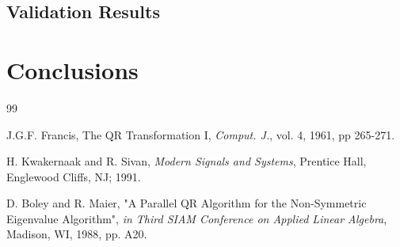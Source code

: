 \documentclass[letterpaper, 10 pt, conference]{ieeeconf}
\begin{document}
\subsection{Validation Results}

\section{Conclusions}







\begin{thebibliography}{99}

J.G.F. Francis, The QR Transformation I, {\it Comput. J.}, vol. 4, 1961, pp 265-271.

H. Kwakernaak and R. Sivan, {\it Modern Signals and Systems}, Prentice Hall, Englewood Cliffs, NJ; 1991.

D. Boley and R. Maier, "A Parallel QR Algorithm for the Non-Symmetric Eigenvalue Algorithm", {\it in Third SIAM Conference on Applied Linear Algebra}, Madison, WI, 1988, pp. A20.

\end{thebibliography}
\end{document}
